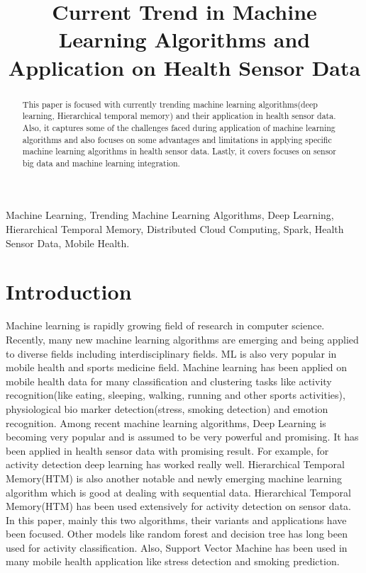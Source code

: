 \documentclass[conference]{IEEEtran}
\begin{document}
\title{Current Trend in Machine Learning Algorithms and Application on
Health Sensor Data}
\author{
}

\maketitle

\begin{abstract}
This paper is focused with currently trending machine learning algorithms(deep learning, Hierarchical temporal memory) and their application in health sensor data. Also, it captures some of the challenges faced during application of machine learning algorithms and also focuses on some advantages and limitations in applying specific machine learning algorithms in health sensor data. Lastly, it covers focuses on sensor big data and machine learning integration.
\end{abstract}

\begin{IEEEkeywords}
Machine Learning, Trending Machine Learning Algorithms, Deep Learning, Hierarchical Temporal Memory, Distributed Cloud Computing, Spark, Health Sensor Data, Mobile Health.
\end{IEEEkeywords}
\IEEEpeerreviewmaketitle

\section{Introduction}
Machine learning is rapidly growing field of research in computer science. Recently, many new machine learning algorithms are emerging and being applied to diverse fields including interdisciplinary fields. ML is also very popular in mobile health and sports medicine field. Machine learning has been applied on mobile health data for many classification and clustering tasks like activity recognition(like eating, sleeping, walking, running and other sports activities), physiological bio marker detection(stress, smoking detection) and emotion recognition. Among recent machine learning algorithms, Deep Learning is becoming very popular and is assumed to be very powerful and promising. It has been applied in health sensor data with promising result. For example, for activity detection deep learning has worked really well. Hierarchical Temporal Memory(HTM) is also another notable and newly emerging machine learning algorithm which is good at dealing with sequential data. Hierarchical Temporal Memory(HTM) has been used extensively for activity detection on sensor data. In this paper, mainly this two algorithms, their variants and applications have been focused. Other models like random forest and decision tree has long been used for activity classification. Also, Support Vector Machine has been used in many mobile health application like stress detection and smoking prediction.\\
\end{document}

